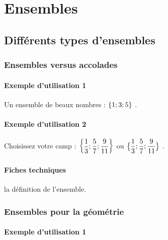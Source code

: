 \documentclass[12pt,a4paper]{article}
\begin{document}
\section{Ensembles}

    \subsection{Différents types d'ensembles}

        \subsubsection{Ensembles versus accolades}

            \paragraph{Exemple d'utilisation 1}

\begin{tcblisting}{}
Un ensemble de beaux nombres : $\geneset{1 ; 3 ; 5}$ .
\end{tcblisting}


            \paragraph{Exemple d'utilisation 2}

\begin{tcblisting}{}
Choisissez votre camp :
$\displaystyle \geneset{\frac{1}{3} ; \frac{5}{7} ; \frac{9}{11}}$
ou 
$\displaystyle \geneset*{\frac{1}{3} ; \frac{5}{7} ; \frac{9}{11}}$ .
\end{tcblisting}


            \paragraph{Fiches techniques}



\IDarg{} la définition de l'ensemble.


        \subsubsection{Ensembles pour la géométrie}

            \paragraph{Exemple d'utilisation 1}
\end{document}
